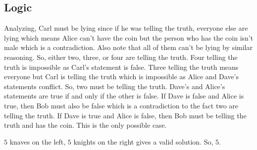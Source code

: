 \documentclass[11pt]{article}
\begin{document}

\subsection{Logic}

\begin{sol}
Analyzing, Carl must be lying since if he was telling the truth, everyone else are lying which means Alice can't have the coin but the person who has the coin isn't male which is a contradiction. Also note that all of them can't be lying by similar reasoning. So, either two, three, or four are telling the truth. Four telling the truth is impossible as Carl's statement is false. Three telling the truth means everyone but Carl is telling the truth which is impossible as Alice and Dave's statements conflict. So, two must be telling the truth. Dave's and Alice's statements are true if and only if the other is false. If Dave is false and Alice is true, then Bob must also be false which is a contradiction to the fact two are telling the truth. If Dave is true and Alice is false, then Bob must be telling the truth and  has the coin. This is the only possible case.
\end{sol}


\begin{sol}
$5$ knaves on the left, $5$ knights on the right gives a valid solution. So, $\boxed{5}$.
\end{sol}
\end{document}
